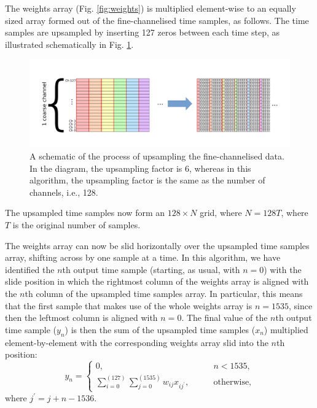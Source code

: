 \documentclass{article}
\begin{document}
The weights array (Fig. \ref{fig:weights}) is multiplied element-wise to an equally sized array formed out of the fine-channelised time samples, as follows.
The time samples are upsampled by inserting 127 zeros between each time step, as illustrated schematically in Fig. \ref{fig:upsample}.
\begin{figure}[!ht]
    \centering
    \includegraphics[scale=0.6]{images/pfb_fig2.pdf}
    \vspace{-1cm}
    \caption{A schematic of the process of upsampling the fine-channelised data. In the diagram, the upsampling factor is 6, whereas in this algorithm, the upsampling factor is the same as the number of channels, i.e., 128.}
    \label{fig:upsample}
\end{figure}
The upsampled time samples now form an $128 \times N$ grid, where $N = 128T$, where $T$ is the original number of samples.

The weights array can now be slid horizontally over the upsampled time samples array, shifting across by one sample at a time.
In this algorithm, we have identified the $n$th output time sample (starting, as usual, with $n = 0$) with the slide position in which the rightmost column of the weights array is aligned with the $n$th column of the upsampled time samples array.
In particular, this means that the first sample that makes use of the whole weights array is $n = 1535$, since then the leftmost column is aligned with $n = 0$.
The final value of the $n$th output time sample ($y_n$) is then the sum of the upsampled time samples ($x_n$) multiplied element-by-element with the corresponding weights array slid into the $n$th position:
\begin{equation}
    y_n = \begin{cases}
        0, &\qquad n < 1535, \\[5pt]
              \sum\limits_{i=0}^{(127)} \sum\limits_{j=0}^{(1535)} w_{ij} x_{ij^\prime}, &\qquad \text{otherwise,}
          \end{cases}
    \label{eqn:invertpfb}
\end{equation}
where $j^\prime = j + n - 1536$.
\end{document}
